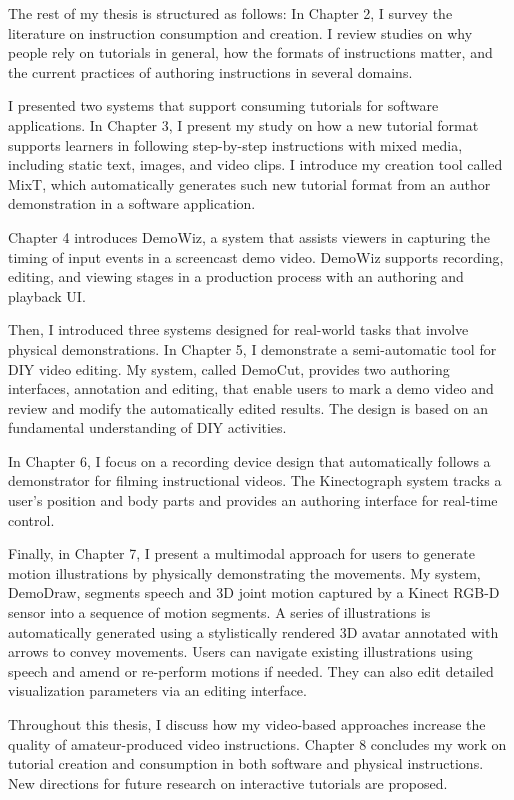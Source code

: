 The rest of my thesis is structured as follows:
%
In Chapter 2, I survey the literature on instruction consumption and creation. I review studies on why people rely on tutorials in general, how the formats of instructions matter, and the current practices of authoring instructions in several domains.

I presented two systems that support consuming tutorials for software applications.
In Chapter 3, I present my study on how a new tutorial format supports learners in following step-by-step instructions with mixed media, including static text, images, and video clips. I introduce my creation tool called MixT, which automatically generates such new tutorial format from an author demonstration in a software application.

Chapter 4 introduces DemoWiz, a system that assists viewers in capturing the timing of input events in a screencast demo video. DemoWiz supports recording, editing, and viewing stages in a production process with an authoring and playback UI.

Then, I introduced three systems designed for real-world tasks that involve physical demonstrations.
In Chapter 5, I demonstrate a semi-automatic tool for DIY video editing. My system, called DemoCut, provides two authoring interfaces, annotation and editing, that enable users to mark a demo video and review and modify the automatically edited results. The design is based on an fundamental understanding of DIY activities.

In Chapter 6, I focus on a recording device design that automatically follows a demonstrator for filming instructional videos. The Kinectograph system tracks a user's position and body parts and provides an authoring interface for real-time control.

Finally, in Chapter 7, I present a multimodal approach for users to generate motion illustrations by physically demonstrating the movements. My system, DemoDraw, segments speech and 3D joint motion captured by a Kinect RGB-D sensor into a sequence of motion segments. A series of illustrations is automatically generated using a stylistically rendered 3D avatar annotated with arrows to convey movements. Users can navigate existing illustrations using speech and amend or re-perform motions if needed. They can also edit detailed visualization parameters via an editing interface.

Throughout this thesis, I discuss how my video-based approaches increase the quality of amateur-produced video instructions. Chapter 8 concludes my work on tutorial creation and consumption in both software and physical instructions. New directions for future research on interactive tutorials are proposed.

